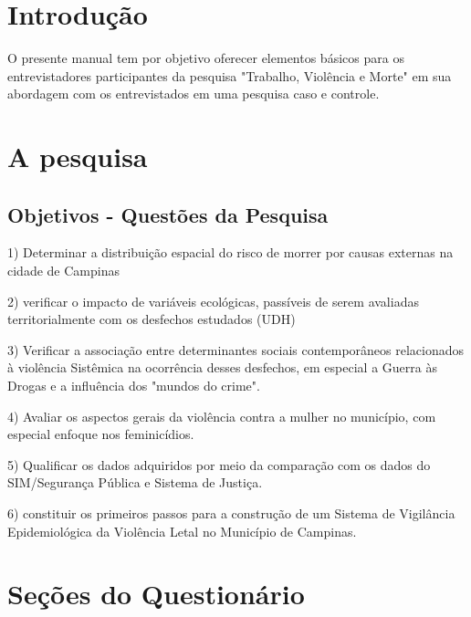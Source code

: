 

\section*{Introdução}

O presente manual tem por objetivo oferecer elementos básicos para os entrevistadores participantes da pesquisa "Trabalho, Violência e Morte" em sua abordagem com os entrevistados em uma pesquisa caso e controle.

\section*{A pesquisa}


\subsection*{Objetivos - Questões da Pesquisa}


1) Determinar a distribuição espacial do risco de morrer por causas externas na cidade de Campinas

2) verificar o impacto de variáveis ecológicas, passíveis de serem avaliadas territorialmente com os desfechos estudados (UDH)


3) Verificar a associação entre determinantes sociais contemporâneos relacionados à violência Sistêmica na ocorrência desses desfechos, em especial a Guerra às Drogas e a influência dos "mundos do crime".

4) Avaliar os aspectos gerais da violência contra a mulher no município, com especial enfoque nos feminicídios.

5) Qualificar os dados adquiridos por meio da comparação com os dados do SIM/Segurança Pública e Sistema de Justiça.


6) constituir os primeiros passos para a construção de um Sistema de Vigilância Epidemiológica da Violência Letal no Município de Campinas.


\section*{Seções do Questionário}


